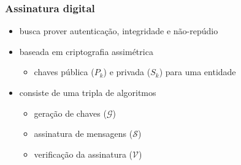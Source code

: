 \documentclass{beamer}
\newcommand{\concat}{\, \vert \vert \,}
\begin{document}
\begin{frame}
  \frametitle{Assinatura digital}
  \begin{itemize}
    \item busca prover autenticação, integridade e não-repúdio
    \item baseada em criptografia assimétrica
    \begin{itemize}
      \item chaves pública ($P_{k}$) e privada ($S_{k}$) para uma entidade
    \end{itemize}
    \item consiste de uma tripla de algoritmos \cite{Goldreich2004}
    \begin{itemize}
      \item geração de chaves ($\mathcal{G}$)
      \item assinatura de mensagens ($\mathcal{S}$)
      \item verificação da assinatura ($\mathcal{V}$)
    \end{itemize}
  \end{itemize}

  \begin{figure}
  \end{figure}
\end{frame}
\end{document}
